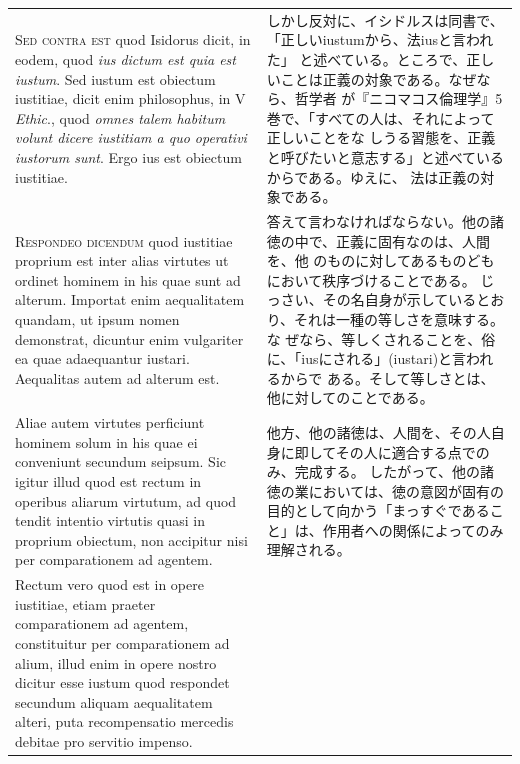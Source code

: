 \documentclass[paper=a4paper,fontsize=10pt,jafontsize=9pt,titlepage]{jlreq}
\begin{document}
\begin{longtable}{p{21em}p{21em}}
\\



{\scshape Sed contra est} quod Isidorus dicit, in eodem, quod {\itshape
 ius dictum est quia est iustum}. Sed iustum est obiectum iustitiae,
 dicit enim philosophus, in V {\itshape Ethic}., quod {\itshape omnes
 talem habitum volunt dicere iustitiam a quo operativi iustorum
 sunt}. Ergo ius est obiectum iustitiae.


&
しかし反対に、イシドルスは同書で、「正しいiustumから、法iusと言われた」
 と述べている。ところで、正しいことは正義の対象である。なぜなら、哲学者
 が『ニコマコス倫理学』5巻で、「すべての人は、それによって正しいことをな
 しうる習態を、正義と呼びたいと意志する」と述べているからである。ゆえに、
 法は正義の対象である。

\\



{\scshape Respondeo dicendum} quod iustitiae proprium est inter alias
 virtutes ut ordinet hominem in his quae sunt ad alterum. Importat enim
 aequalitatem quandam, ut ipsum nomen demonstrat, dicuntur enim
 vulgariter ea quae adaequantur iustari. Aequalitas autem ad alterum
 est. 

&

答えて言わなければならない。他の諸徳の中で、正義に固有なのは、人間を、他
 のものに対してあるものどもにおいて秩序づけることである。
じっさい、その名自身が示しているとおり、それは一種の等しさを意味する。な
 ぜなら、等しくされることを、俗に、「iusにされる」(iustari)と言われるからで
 ある。そして等しさとは、他に対してのことである。

\\

Aliae autem virtutes perficiunt hominem solum in his quae ei
 conveniunt secundum seipsum. Sic igitur illud quod est rectum in
 operibus aliarum virtutum, ad quod tendit intentio virtutis quasi in
 proprium obiectum, non accipitur nisi per comparationem ad
 agentem. 

&

他方、他の諸徳は、人間を、その人自身に即してその人に適合する点でのみ、完成する。
したがって、他の諸徳の業においては、徳の意図が固有の目的として向かう「まっすぐであること」は、作用者への関係によってのみ理解される。


\\


Rectum vero quod est in opere iustitiae, etiam praeter
 comparationem ad agentem, constituitur per comparationem ad alium,
 illud enim in opere nostro dicitur esse iustum quod respondet secundum
 aliquam aequalitatem alteri, puta recompensatio mercedis debitae pro
 servitio impenso. 


\end{longtable}
\end{document}
